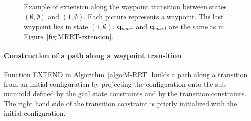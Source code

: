 \begin{figure}
\begin{center}
  \end{center}
  \caption{Example of extension along the waypoint transition between states
    $(\emptyset,\emptyset)$ and $(1,\emptyset)$. Each picture represents a
    waypoint. The last waypoint lies in state $(1,\emptyset)$. $\mathbf{q}_{near}$
    and $\mathbf{q}_{rand}$ are the same as in Figure~\ref{fig:MRRT-extension}.}
  \label{fig:MRRT-extension-wp}
\end{figure}

\paragraph{Construction of a path along a waypoint transition} Function
{\scriptsize EXTEND} in Algorithm~\ref{algo:M-RRT} builds a path along a
transition from an initial configuration by projecting the configuration
onto the sub-manifold defined by the goal state constraints and by the
transition constraints. The right hand side of the transition constraint is
priorly initialized with the initial configuration.

